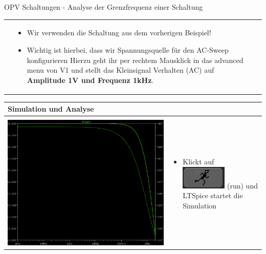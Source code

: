 \begin{frame}[t]{OPV Schaltungen - Analyse der Grenzfrequenz einer Schaltung }
\begin{spacing}{0.9}
\begin{tiny}
\begin{table}[h!]
\begin{tabular}{p{2cm} p{2cm} p{6cm}}
\begin{minipage}{.2\textwidth}
            \end{minipage} 
            & 
            \begin{minipage}{.5\textwidth}
            \begin{itemize}
              \item Wir verwenden die Schaltung aus dem vorherigen Beispiel!
              \item Wichtig ist hierbei, dass wir Spannungsquelle für den AC-Sweep konfigurieren
              Hierzu geht ihr per rechtem Mausklick in das advanced menu von V1 und stellt das Kleinsignal Verhalten (AC)
              auf \textbf{Amplitude 1V und Frequenz 1kHz}.
            \end{itemize}
            \end{minipage} 
            \\
          \end{tabular}
          \begin{tabular}{p{6cm} p{4cm}}
            \hline
            \textbf{Simulation und Analyse} & \\
            \hline \\
            \begin{minipage}{.6\textwidth}
              \includegraphics[width=0.7\linewidth]{pictures/analysis_6.png}
            \end{minipage} 
            & 
            \begin{minipage}{.4\textwidth}
            \begin{itemize}
              \item Klickt auf \includegraphics[scale=0.3]{pictures/run.png} (run) und LTSpice startet die Simulation

\end{itemize}
\end{minipage}
\end{tabular}
\end{table}
\end{tiny}
\end{spacing}
\end{frame}
